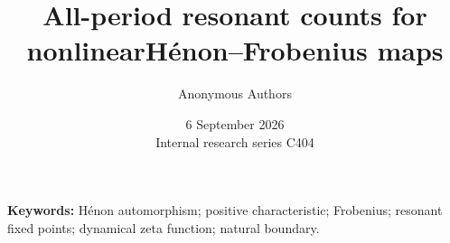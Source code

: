 \documentclass[11pt]{article}
\title{All-period resonant counts for nonlinear\newline H\'enon--Frobenius maps}
\author{Anonymous Authors}
\date{6 September 2026\\[3pt]{\small Internal research series C404}}
\begin{document}
\maketitle
\begin{abstract}

\end{abstract}
\noindent\textbf{Keywords:} H\'enon automorphism; positive characteristic;
Frobenius; resonant fixed points; dynamical zeta function; natural boundary.











\end{document}
